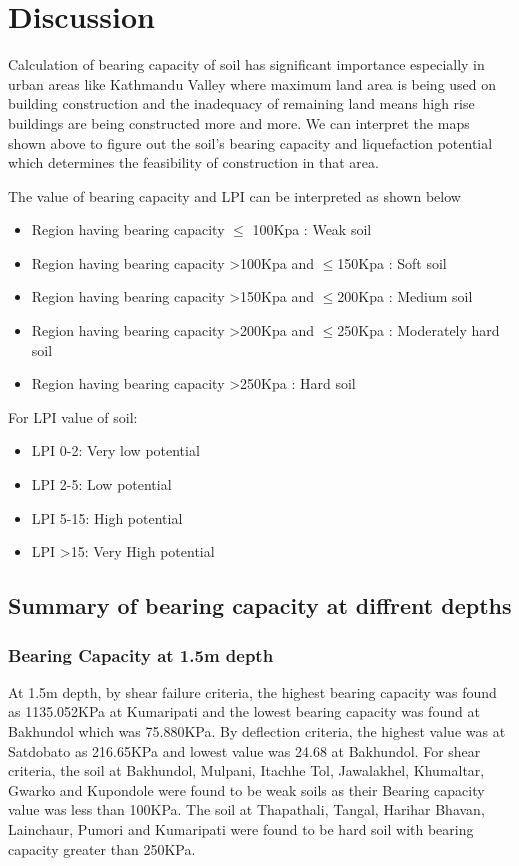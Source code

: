 \chapter{Discussion}
Calculation of bearing capacity of soil has significant importance especially in urban areas like Kathmandu Valley where maximum land area is being used on building construction and the inadequacy of remaining land means high rise buildings are being constructed more and more. We can interpret the maps shown above to figure out the soil’s bearing capacity and liquefaction potential which determines the feasibility of construction in that area. 

The value of bearing capacity and LPI can be interpreted as shown below

\begin{itemize}
\item Region having bearing capacity $\le$ 100Kpa 			: Weak soil
\item Region having bearing capacity \textgreater 100Kpa and $\le$150Kpa	: Soft soil
\item Region having bearing capacity \textgreater 150Kpa and $\le$200Kpa	: Medium soil
\item Region having bearing capacity \textgreater 200Kpa and $\le$250Kpa	: Moderately hard soil
\item Region having bearing capacity \textgreater 250Kpa			: Hard soil
\end{itemize}

For LPI value of soil:
\begin{itemize}
\item LPI 0-2: Very low potential
\item LPI 2-5: Low potential
\item LPI 5-15: High potential
\item LPI >15: Very High potential
\end{itemize}

\section{Summary of bearing capacity at diffrent depths}
\subsection{Bearing Capacity at 1.5m depth}
At 1.5m depth, by shear failure criteria, the highest bearing capacity was found as 1135.052KPa at Kumaripati and the lowest bearing capacity was found at Bakhundol which was 75.880KPa. By deflection criteria, the highest value was at Satdobato as 216.65KPa and lowest value was 24.68 at Bakhundol.
For shear criteria, the soil at Bakhundol, Mulpani, Itachhe Tol, Jawalakhel, Khumaltar, Gwarko and Kupondole were found to be weak soils as their Bearing capacity value was less than 100KPa. The soil at Thapathali, Tangal, Harihar Bhavan, Lainchaur, Pumori and Kumaripati were found to be hard soil with bearing capacity greater than 250KPa.

